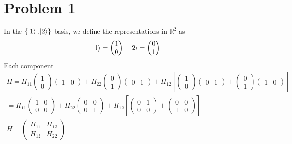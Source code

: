 \documentclass[]{article}
\begin{document}

\hypertarget{problem-1}{%
\section{Problem 1}\label{problem-1}}

In the \(\left\{ \ket{1},\ket{2} \right\}\) basis, we define the
representations in \(\mathbb{R}^{2}\) as\\
\[
\begin{align}
\ket{1}  = \begin{pmatrix}
1 \\
0
\end{pmatrix}  &  & \ket{2} =\begin{pmatrix}
0 \\
1
\end{pmatrix}
\end{align}
\] Each component \[
\begin{align}
H = H_{11}\begin{pmatrix}
1 \\
0 
\end{pmatrix}\begin{pmatrix}
1 & 0
\end{pmatrix}+H_{22}\begin{pmatrix}
0 \\
1
\end{pmatrix}\begin{pmatrix}
0 & 1
\end{pmatrix}+H_{12}\left[ \begin{pmatrix}
1 \\
0
\end{pmatrix}\begin{pmatrix}
0 & 1
\end{pmatrix}+\begin{pmatrix}
0 \\
1
\end{pmatrix} \begin{pmatrix}
1 & 0
\end{pmatrix}\right]   
\\
=H_{11}\begin{pmatrix}
1 & 0 \\
0 & 0
\end{pmatrix}+H_{22}\begin{pmatrix}
0 & 0 \\
0 & 1
\end{pmatrix}+H_{12}\left[ \begin{pmatrix}
0 & 1 \\
0 & 0
\end{pmatrix} +\begin{pmatrix}
0 & 0 \\
1 & 0
\end{pmatrix}\right]  \\
H=\begin{pmatrix}
H_{11} & H_{12} \\
H_{12} & H_{22}
\end{pmatrix}
\end{align}
\]
\end{document}
